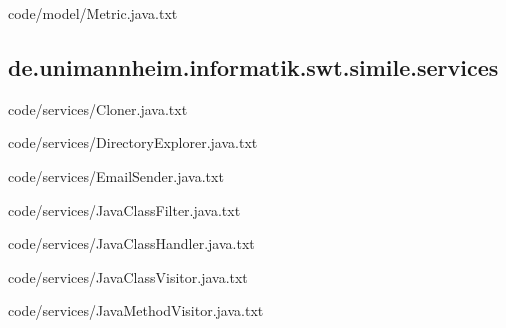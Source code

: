 
{code/model/Metric.java.txt}
\subsection{de.unimannheim.informatik.swt.simile.services}

{code/services/Cloner.java.txt}


{code/services/DirectoryExplorer.java.txt}


{code/services/EmailSender.java.txt}


{code/services/JavaClassFilter.java.txt}


{code/services/JavaClassHandler.java.txt}


{code/services/JavaClassVisitor.java.txt}


{code/services/JavaMethodVisitor.java.txt}

